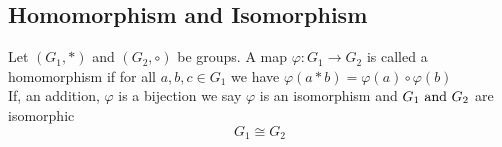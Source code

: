 \subsection{Homomorphism and Isomorphism}

\begin{definition}
    Let $\left( G_1,* \right)$ and $\left( G_2,\circ \right)$
    be groups. A map $\varphi: G_1 \rightarrow G_2$ is called 
    a homomorphism if for all $a,b,c \in G_1$ we have 
    $\varphi\left( a*b \right)=\varphi\left( a \right)\circ \varphi\left( b \right)$\\
    If, an addition, $\varphi$ is a bijection we say $\varphi$ is an isomorphism
    and $G_1 \text{ and } G_2$ are isomorphic \[G_1\cong G_2\]
\end{definition}

